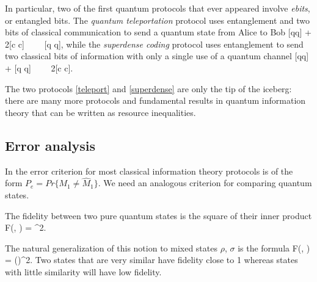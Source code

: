 \documentclass[aps,11pt,twoside,letterpaper]{article}
\theoremstyle{plain}
\theoremstyle{definition}
\begin{document}
            In particular, two of the first quantum protocols that ever appeared involve \emph{ebits}, 
            or entangled bits.  
            The \emph{quantum teleportation} protocol \cite{teleportation} uses entanglement and two bits of classical
            communication to send a quantum state from Alice to Bob
            \be	{}	\label{teleport}
                [qq] + 2[c \to c]	\ \ \geq \ \ 	[q \to q],
            \ee
            while the \emph{superdense coding} protocol \cite{superdense} uses entanglement to send two classical
            bits of information with only a single use of a quantum channel
            \be	{}	\label{superdense}
                [qq] + [q \to q]	\ \ \geq \ \ 	2[c \to c].
            \ee

            The two protocols \eqref{teleport} and \eqref{superdense} are only the tip of the iceberg: 
            there are many more protocols and fundamental results in quantum information theory that can be 
            written as resource inequalities.
                        
			

		\bigskip		
		\subsection{Error analysis}		\label{subsection:distance-measures}
    
            In the error criterion for most classical information theory protocols is of the form 
            $P_e = Pr\{ M_1 \neq \hat{M}_1 \}$.
            We need an analogous criterion for comparing quantum states.

			The fidelity between two pure  quantum states is the square of their inner product
			\be
				F(\ket{\varphi}, \ket{\psi}) = \left\vert \braket{\varphi}{\psi} \right\vert^2.
			\ee
			
			The natural generalization of this notion to mixed states $\rho$, $\sigma$ is
			the formula
	    	\be
	    		F(\rho, \sigma) = \left(\sqrt{\sqrt{\rho}\sigma\sqrt{\rho}}\right)^2.
	    	\ee
		    Two states that are very similar have fidelity close to 1 whereas states with little similarity 
		    will have low fidelity.
		    
\end{document}
